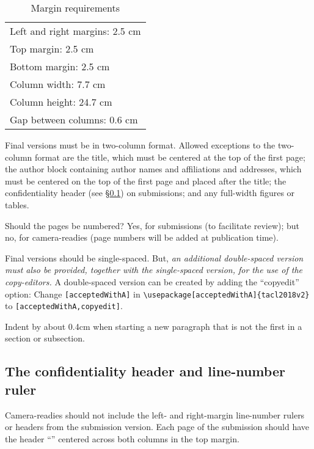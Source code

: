 \documentclass[11pt,a4paper]{article}
\newcommand{\styleFileVersion}{tacl2018v2}
\newcommand{\Taclpaper}{Final version\xspace}
\newcommand{\Taclpapers}{Final versions\xspace}
\newcommand{\Taclpaper}{Submission\xspace}
\newcommand{\Taclpapers}{{\Taclpaper}s\xspace}
\begin{document}
\begin{table}[ht]
\begin{center}
\begin{tabular}{|l|}  \hline
Left and right margins: 2.5 cm \\
Top margin: 2.5 cm \\
Bottom margin: 2.5 cm \\
Column width: 7.7 cm \\
Column height: 24.7 cm \\
Gap between columns: 0.6 cm \\ \hline
\end{tabular}
\end{center}
\caption{\label{tab:margin-table} Margin requirements}
\end{table}


\Taclpapers must be in two-column format.
Allowed exceptions to the two-column format are the title, which must be
centered at the top of the first page;
\iftaclpubformat
the author block containing author names and affiliations and addresses, which
must be centered on the top of the first page and placed after the title;
\else
the  confidentiality header (see \S\ref{sec:ruler-and-header}) on submissions;
\fi
and any full-width figures or tables.

Should the pages be numbered?  Yes, for submissions (to facilitate review); but
no, for camera-readies (page numbers will be added at publication time).

\Taclpapers should be single-spaced.
\iftaclpubformat
But, {\em an additional double-spaced version must also be provided, together with the
single-spaced version, for the use of the copy-editors.}  A double-spaced version can
be created by adding the ``copyedit'' option: Change \verb+[acceptedWithA]+ in
{\footnotesize {\tt {\textbackslash usepackage}[acceptedWithA]\{\styleFileVersion\}}}
to \verb+[acceptedWithA,copyedit]+.
\fi

{Indent} by about 0.4cm when starting a new paragraph that is not the first in a
section or subsection.

\subsection{The confidentiality header and line-number ruler}
\label{sec:ruler-and-header}
\iftaclpubformat
Camera-readies should not include the left- and right-margin line-number rulers
or headers from the submission version.
\else
Each page of the submission should have the header ``\confidentialtext''
centered across both columns in the top margin.
\end{document}
